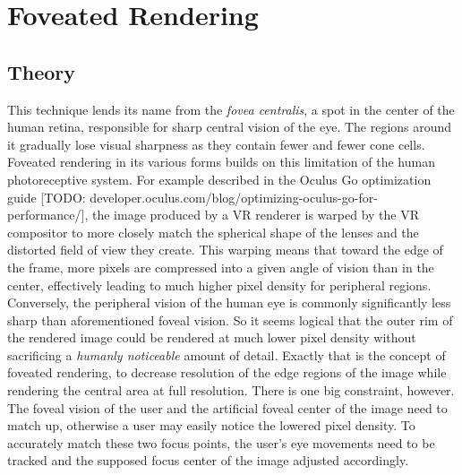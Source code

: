 
\section{Foveated Rendering}
\subsection{Theory}
This technique lends its name from the \textit{fovea centralis}, a spot in the center of the human retina, responsible for sharp central vision of the eye. The regions around it gradually lose visual sharpness as they contain fewer and fewer cone cells. 
Foveated rendering in its various forms builds on this limitation of the human photoreceptive system. For example described in the Oculus Go optimization guide [TODO: developer.oculus.com/blog/optimizing-oculus-go-for-performance/], the image produced by a VR renderer is warped by the VR compositor to more closely match the spherical shape of the lenses and the distorted field of view they create. This warping means that toward the edge of the frame, more pixels are compressed into a given angle of vision than in the center, effectively leading to much higher pixel density for peripheral regions. 
Conversely, the peripheral vision of the human eye is commonly significantly less sharp than aforementioned foveal vision. So it seems logical that the outer rim of the rendered image could be rendered at much lower pixel density without sacrificing a \textit{humanly noticeable} amount of detail. 
Exactly that is the concept of foveated rendering, to decrease resolution of the edge regions of the image while rendering the central area at full resolution. 
There is one big constraint, however. The foveal vision of the user and the artificial foveal center of the image need to match up, otherwise a user may easily notice the lowered pixel density. To accurately match these two focus points, the user's eye movements need to be tracked and the supposed focus center of the image adjusted accordingly. 

